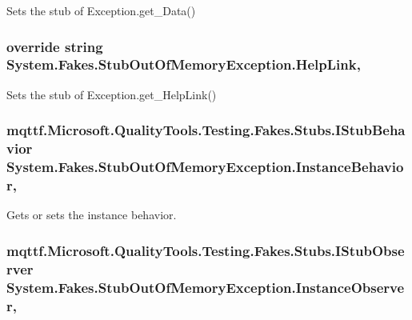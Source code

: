 Sets the stub of Exception.\-get\-\_\-\-Data()

\hypertarget{class_system_1_1_fakes_1_1_stub_out_of_memory_exception_a0d1dee7a0650597391ff1f4a56844261}{
\subsubsection[{Help\-Link}]{\setlength{\rightskip}{0pt plus 5cm}override string System.\-Fakes.\-Stub\-Out\-Of\-Memory\-Exception.\-Help\-Link\hspace{0.3cm}{\ttfamily [get]}, {\ttfamily [set]}}}\label{class_system_1_1_fakes_1_1_stub_out_of_memory_exception_a0d1dee7a0650597391ff1f4a56844261}


Sets the stub of Exception.\-get\-\_\-\-Help\-Link()

\hypertarget{class_system_1_1_fakes_1_1_stub_out_of_memory_exception_a54342fb295eeb162f8779dbb09f9e0ff}{
\subsubsection[{Instance\-Behavior}]{\setlength{\rightskip}{0pt plus 5cm}mqttf.\-Microsoft.\-Quality\-Tools.\-Testing.\-Fakes.\-Stubs.\-I\-Stub\-Behavior System.\-Fakes.\-Stub\-Out\-Of\-Memory\-Exception.\-Instance\-Behavior\hspace{0.3cm}{\ttfamily [get]}, {\ttfamily [set]}}}\label{class_system_1_1_fakes_1_1_stub_out_of_memory_exception_a54342fb295eeb162f8779dbb09f9e0ff}


Gets or sets the instance behavior.

\hypertarget{class_system_1_1_fakes_1_1_stub_out_of_memory_exception_a0e42200e4247d278223891dfa2616489}{
\subsubsection[{Instance\-Observer}]{\setlength{\rightskip}{0pt plus 5cm}mqttf.\-Microsoft.\-Quality\-Tools.\-Testing.\-Fakes.\-Stubs.\-I\-Stub\-Observer System.\-Fakes.\-Stub\-Out\-Of\-Memory\-Exception.\-Instance\-Observer\hspace{0.3cm}{\ttfamily [get]}, {\ttfamily [set]}}}\label{class_system_1_1_fakes_1_1_stub_out_of_memory_exception_a0e42200e4247d278223891dfa2616489}


